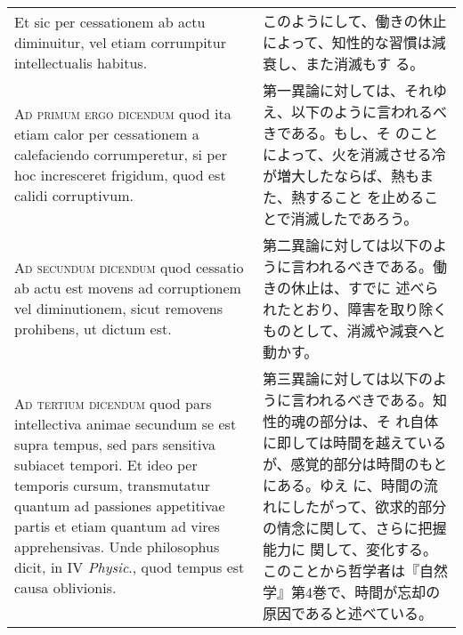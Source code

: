 \documentclass[10pt]{jsarticle} %
\begin{document}
\begin{longtable}{p{21em}p{21em}}
\\

Et sic per cessationem ab actu diminuitur, vel etiam corrumpitur
intellectualis habitus.

&

このようにして、働きの休止によって、知性的な習慣は減衰し、また消滅もす
る。

\\


{\scshape Ad primum ergo dicendum} quod ita etiam calor per
cessationem a calefaciendo corrumperetur, si per hoc incresceret
frigidum, quod est calidi corruptivum.

&


第一異論に対しては、それゆえ、以下のように言われるべきである。もし、そ
のことによって、火を消滅させる冷が増大したならば、熱もまた、熱すること
を止めることで消滅したであろう。

\\



{\scshape Ad secundum dicendum} quod cessatio ab actu est movens ad
corruptionem vel diminutionem, sicut removens prohibens, ut dictum
est.

&

第二異論に対しては以下のように言われるべきである。働きの休止は、すでに
述べられたとおり、障害を取り除くものとして、消滅や減衰へと動かす。

\\



{\scshape Ad tertium dicendum} quod pars intellectiva animae secundum
se est supra tempus, sed pars sensitiva subiacet tempori. Et ideo per
temporis cursum, transmutatur quantum ad passiones appetitivae partis
et etiam quantum ad vires apprehensivas. Unde philosophus dicit, in IV
{\itshape Physic}., quod tempus est causa oblivionis.

&

第三異論に対しては以下のように言われるべきである。知性的魂の部分は、そ
れ自体に即しては時間を越えているが、感覚的部分は時間のもとにある。ゆえ
に、時間の流れにしたがって、欲求的部分の情念に関して、さらに把握能力に
関して、変化する。このことから哲学者は『自然学』第4巻で、時間が忘却の
原因であると述べている。

\end{longtable}
\end{document}
